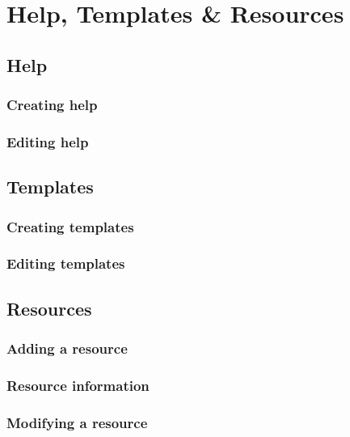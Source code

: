 \documentclass[12 pt]{book}
\begin{document}
%
%
%

\chapter{Help, Templates \& Resources}

\section{Help}

\subsection{Creating help}

\subsection{Editing help}

\section{Templates}

\subsection{Creating templates}

\subsection{Editing templates}

\section{Resources}

\subsection{Adding a resource}

\subsection{Resource information}

\subsection{Modifying a resource}

%
%
%
\end{document}
